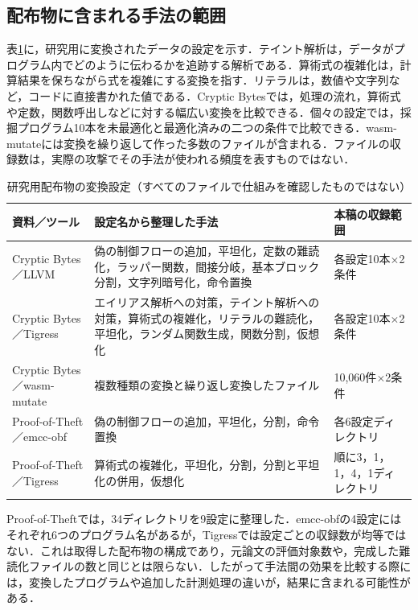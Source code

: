 \documentclass[submit,techrep]{ipsj}
\begin{document}
\subsection{配布物に含まれる手法の範囲}
表\ref{tab:settings}に，研究用に変換されたデータの設定を示す．テイント解析は，データがプログラム内でどのように伝わるかを追跡する解析である．算術式の複雑化は，計算結果を保ちながら式を複雑にする変換を指す．リテラルは，数値や文字列など，コードに直接書かれた値である．Cryptic Bytesでは，処理の流れ，算術式や定数，関数呼出しなどに対する幅広い変換を比較できる．個々の設定では，採掘プログラム10本を未最適化と最適化済みの二つの条件で比較できる．wasm-mutateには変換を繰り返して作った多数のファイルが含まれる．ファイルの収録数は，実際の攻撃でその手法が使われる頻度を表すものではない．
\begin{table}[t]
\caption{研究用配布物の変換設定（すべてのファイルで仕組みを確認したものではない）}
\label{tab:settings}
\centering\small
\begin{tabular}{>{\raggedright\arraybackslash}p{32mm}p{94mm}p{32mm}}
\hline
資料／ツール & 設定名から整理した手法 & 本稿の収録範囲 \\
\hline
Cryptic Bytes／LLVM & 偽の制御フローの追加，平坦化，定数の難読化，ラッパー関数，間接分岐，基本ブロック分割，文字列暗号化，命令置換 & 各設定10本$\times$2条件 \\
Cryptic Bytes／Tigress & エイリアス解析への対策，テイント解析への対策，算術式の複雑化，リテラルの難読化，平坦化，ランダム関数生成，関数分割，仮想化 & 各設定10本$\times$2条件 \\
Cryptic Bytes／wasm-mutate & 複数種類の変換と繰り返し変換したファイル & 10,060件$\times$2条件 \\
Proof-of-Theft／emcc-obf & 偽の制御フローの追加，平坦化，分割，命令置換 & 各6設定ディレクトリ \\
Proof-of-Theft／Tigress & 算術式の複雑化，平坦化，分割，分割と平坦化の併用，仮想化 & 順に3，1，1，4，1ディレクトリ \\
\hline
\end{tabular}
\end{table}
Proof-of-Theftでは，34ディレクトリを9設定に整理した．emcc-obfの4設定にはそれぞれ6つのプログラム名があるが，Tigressでは設定ごとの収録数が均等ではない．これは取得した配布物の構成であり，元論文の評価対象数や，完成した難読化ファイルの数と同じとは限らない．したがって手法間の効果を比較する際には，変換したプログラムや追加した計測処理の違いが，結果に含まれる可能性がある．
\end{document}
